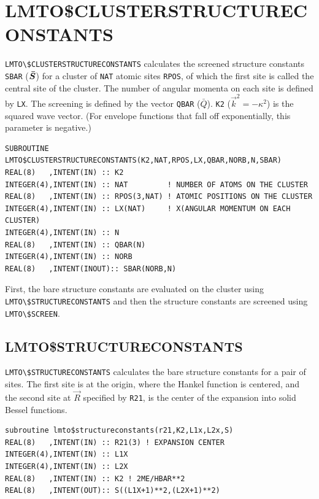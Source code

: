 \documentclass[11pt,a4paper]{report}
\begin{document}
\section{LMTO\$CLUSTERSTRUCTURECONSTANTS}
\verb|LMTO\$CLUSTERSTRUCTURECONSTANTS| calculates the screened
structure constants \verb|SBAR| ($\bm{\bar{S}}$) for a cluster of
\verb|NAT| atomic sites \verb|RPOS|, of which the first site is called
the central site of the cluster. The number of angular momenta on each
site is defined by \verb|LX|. The screening is defined by the vector
\verb|QBAR| ($\bar{Q}$). \verb|K2| ($\vec{k}^2=-\kappa^2$) is the
squared wave vector. (For envelope functions that fall off
exponentially, this parameter is negative.)

\begin{verbatim}
SUBROUTINE LMTO$CLUSTERSTRUCTURECONSTANTS(K2,NAT,RPOS,LX,QBAR,NORB,N,SBAR)
REAL(8)   ,INTENT(IN) :: K2          
INTEGER(4),INTENT(IN) :: NAT         ! NUMBER OF ATOMS ON THE CLUSTER
REAL(8)   ,INTENT(IN) :: RPOS(3,NAT) ! ATOMIC POSITIONS ON THE CLUSTER
INTEGER(4),INTENT(IN) :: LX(NAT)     ! X(ANGULAR MOMENTUM ON EACH CLUSTER)
INTEGER(4),INTENT(IN) :: N
REAL(8)   ,INTENT(IN) :: QBAR(N)
INTEGER(4),INTENT(IN) :: NORB
REAL(8)   ,INTENT(INOUT):: SBAR(NORB,N)
\end{verbatim}




First, the bare structure constants are evaluated on the cluster using
\verb|LMTO\$STRUCTURECONSTANTS| and then the structure constants are
screened using \verb|LMTO\$SCREEN|.

\subsection{LMTO\$STRUCTURECONSTANTS}
\verb|LMTO\$STRUCTURECONSTANTS| calculates the bare structure
constants for a pair of sites. The first site is at the origin, where
the Hankel function is centered, and the second site at $\vec{R}$
specified by \verb|R21|, is the center of the expansion into solid
Bessel functions.

\begin{verbatim}
subroutine lmto$structureconstants(r21,K2,L1x,L2x,S)
REAL(8)   ,INTENT(IN) :: R21(3) ! EXPANSION CENTER
INTEGER(4),INTENT(IN) :: L1X
INTEGER(4),INTENT(IN) :: L2X
REAL(8)   ,INTENT(IN) :: K2 ! 2ME/HBAR**2
REAL(8)   ,INTENT(OUT):: S((L1X+1)**2,(L2X+1)**2)
\end{verbatim}
\end{document}

